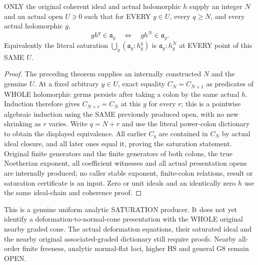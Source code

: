 \begin{theorem}
\label{hir:relative-normal-coherent-saturation-original-consumer}
\leanok
{}
ONLY the original coherent ideal and actual holomorphic $h$ supply
an integer $N$ and an actual open $U\ni0$ such that for EVERY
$y\in U$, every $q\geq N$, and every actual holomorphic $g$,
\[
 g h^q\in\mathfrak a_y\quad\Longleftrightarrow\quad
 g h^N\in\mathfrak a_y.
\]
Equivalently the literal saturation $\bigcup_q(\mathfrak a_y:h_y^q)$
is $\mathfrak a_y:h_y^N$ at EVERY point of this SAME $U$.
\end{theorem}
\begin{proof}
The preceding theorem supplies an internally constructed $N$ and
the genuine $U$. At a fixed arbitrary $y\in U$, exact equality
$C_N=C_{N+1}$ as predicates of WHOLE holomorphic germs persists
after taking a colon by the same actual $h$. Induction therefore
gives $C_{N+r}=C_N$ at this $y$ for every $r$; this is a pointwise
algebraic induction using the SAME previously produced open, with
no new shrinking as $r$ varies. Write $q=N+r$ and use the literal
power-colon dictionary to obtain the displayed equivalence.
All earlier $C_q$ are contained in $C_N$ by actual ideal closure,
and all later ones equal it, proving the saturation statement.
Original finite generators and the finite generators of both
colons, the true Noetherian exponent, all coefficient witnesses
and all actual presentation opens are internally produced; no
caller stable exponent, finite-colon relations, result or
saturation certificate is an input. Zero or unit ideals and an
identically zero $h$ use the same ideal-chain and coherence proof.
\end{proof}

\begin{remark}
This is a genuine uniform analytic SATURATION producer. It does
not yet identify a deformation-to-normal-cone presentation with
the WHOLE original nearby graded cone. The actual deformation
equations, their saturated ideal and the nearby original
associated-graded dictionary still require proofs. Nearby
all-order finite freeness, analytic normal-flat loci, higher HS
and general G8 remain OPEN.
\end{remark}
